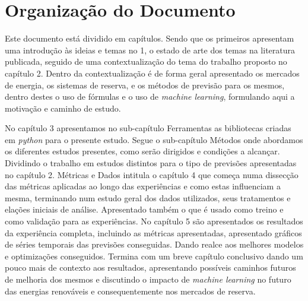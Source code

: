 \section{Organização do Documento \label{se:organização}}

Este documento está dividido em capítulos. Sendo que os primeiros apresentam uma introdução às ideias e temas no 1, o estado de arte dos temas na literatura publicada, seguido de uma contextualização do tema do trabalho proposto no capítulo 2. Dentro da contextualização é de forma geral apresentado os mercados de energia, os sistemas de reserva, e os métodos de previsão para os mesmos, dentro destes o uso de fórmulas e o uso de \textit{machine learning}, formulando aqui a motivação e caminho de estudo.\par
No capítulo 3 apresentamos no sub-capítulo Ferramentas as bibliotecas criadas em \textit{python} para o presente estudo.
Segue o sub-capítulo Métodos onde abordamos os diferentes estudos presentes, como serão dirigidos e condições a alcançar. Dividindo o trabalho em estudos distintos para o tipo de previsões apresentadas no capítulo 2.
Métricas e Dados intitula o capítulo 4 que começa numa dissecção das métricas aplicadas ao longo das experiências e como estas influenciam a mesma, terminando num estudo geral dos dados utilizados, seus tratamentos e elações iniciais de análise. Apresentado também o que é usado como treino e como validação para as experiências.
No capítulo 5 são apresentados os resultados da experiência completa, incluindo as métricas apresentadas, apresentado gráficos de séries temporais das previsões conseguidas. Dando realce aos melhores modelos e optimizações conseguidos.
Termina com um breve capítulo conclusivo dando um pouco mais de contexto aos resultados, apresentando possíveis caminhos futuros de melhoria dos mesmos e discutindo o impacto de \textit{machine learning} no futuro das energias renováveis e consequentemente nos mercados de reserva.

